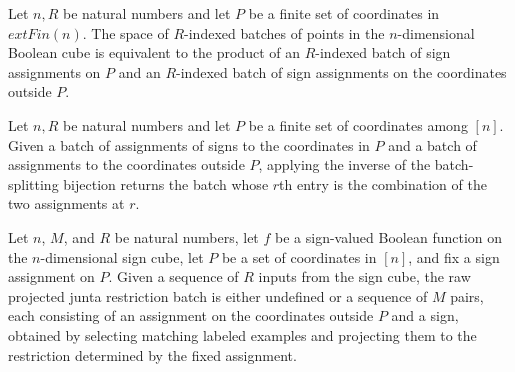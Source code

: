 \begin{definition}
\label{FABL.juntaInputBatchSplitEquiv}
\leanok
{}
Let $n,R$ be natural numbers and let $P$ be a finite set of coordinates in
$	ext{Fin}(n)$. The space of $R$-indexed batches of points in the $n$-dimensional
Boolean cube is equivalent to the product of an $R$-indexed batch of sign assignments on
$P$ and an $R$-indexed batch of sign assignments on the coordinates outside $P$.
\end{definition}

\begin{theorem}
\label{FABL.juntaInputBatchSplitEquiv_symm_apply}
\leanok
{}
Let $n,R$ be natural numbers and let $P$ be a finite set of coordinates among $[n]$.
Given a batch of assignments of signs to the coordinates in $P$ and a batch of
assignments to the coordinates outside $P$, applying the inverse of the batch-splitting
bijection returns the batch whose $r$th entry is the combination of the two assignments
at $r$.
\end{theorem}

\begin{definition}
\label{FABL.rawProjectedJuntaRestrictionBatch}
\leanok
{}
Let $n$, $M$, and $R$ be natural numbers, let $f$ be a sign-valued Boolean function on
the $n$-dimensional sign cube, let $P$ be a set of coordinates in $[n]$, and fix a sign
assignment on $P$. Given a sequence of $R$ inputs from the sign cube, the raw projected
junta restriction batch is either undefined or a sequence of $M$ pairs, each consisting
of an assignment on the coordinates outside $P$ and a sign, obtained by selecting
matching labeled examples and projecting them to the restriction determined by the fixed
assignment.
\end{definition}

